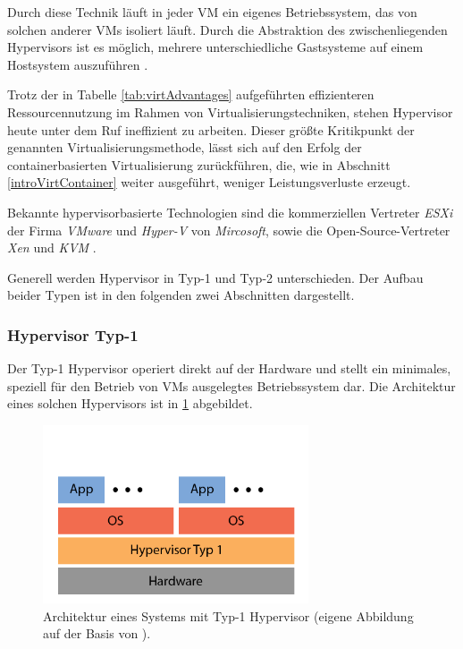 \documentclass[../main.tex]{subfiles}
\begin{document}
      Durch diese Technik läuft in jeder \acrshort{VM} ein eigenes Betriebssystem, das von solchen anderer \acrshort{VM}s isoliert läuft. Durch die Abstraktion des zwischenliegenden Hypervisors ist es möglich, mehrere unterschiedliche Gastsysteme auf einem Hostsystem auszuführen \cite[S.2]{containerVirtPerformance}\cite[S.106]{tanenbaumOS}.

			Trotz der in Tabelle \ref{tab:virtAdvantages} aufgeführten effizienteren Ressourcennutzung im Rahmen von Virtualisierungstechniken, stehen Hypervisor heute unter dem Ruf ineffizient zu arbeiten. Dieser größte Kritikpunkt der genannten Virtualisierungsmethode, lässt sich auf den Erfolg der containerbasierten Virtualisierung zurückführen, die, wie in Abschnitt \ref{introVirtContainer} weiter ausgeführt, weniger Leistungsverluste erzeugt.

			Bekannte hypervisorbasierte Technologien sind die kommerziellen Vertreter \emph{ESXi} der Firma \emph{VMware} und \emph{Hyper-V} von \emph{Mircosoft}, sowie die Open-Source-Vertreter \emph{Xen} und \emph{KVM} \cite[S.1]{dockerLXCKub}.

      Generell werden Hypervisor in Typ-1 und Typ-2 unterschieden. Der Aufbau beider Typen ist in den folgenden zwei Abschnitten dargestellt.


			\subsubsection{Hypervisor Typ-1}
				Der Typ-1 Hypervisor operiert direkt auf der Hardware und stellt ein minimales, speziell für den Betrieb von VMs ausgelegtes Betriebssystem dar. Die Architektur eines solchen Hypervisors ist in \fig \ref{fig:intro_hypervisor1} abgebildet.

				\begin{figure}[h]
	          \centering
	          \includegraphics[width=0.7\textwidth]{./images/intro_hypervisor1.png}
	          \caption{Architektur eines Systems mit Typ-1 Hypervisor (eigene Abbildung auf der Basis von \cite[S.107]{tanenbaumOS}).}
	          \label{fig:intro_hypervisor1}
	      \end{figure}
\end{document}
